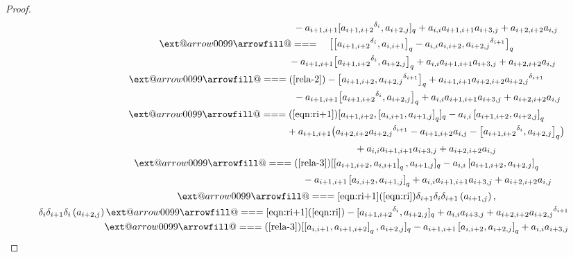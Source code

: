 \documentclass[10pt,a4paper]{amsart}
\makeatletter
\def\x@arrow{\DOTSB\Relbar}
\def\xlongequalsignfill@{\arrowfill@\x@arrow\Relbar\x@arrow}
\providecommand{\xlongequal}[2][]{%
	\ext@arrow 0099\xlongequalsignfill@{#1}{#2}}
\numberwithin{equation}{section}
\def\lr#1{\left[#1\right]}
\def\lrb#1{\left(#1\right)}
\def\d{\delta}
\makeatother
\begin{document}
\begin{proof}
\begin{gather*}
 \phantom{ \d_i\d_{i+1}\d_i\lrb{a_{i+1,j}}\xlongequal{\qquad}\!\!}{} -a_{i+1,i+1}[ {a_{i+1,i+2}}^{\d_{i}}, a_{i+2,j}]_q +a_{i,i}a_{i+1,i+1}a_{i+3,j}+a_{i+2,i+2}a_{i,j}\\
 \phantom{ \d_i\d_{i+1}\d_i\lrb{a_{i+1,j}}}{} \xlongequal{\quad}
\bigl[\bigl[{a_{i+1,i+2}}^{\d_{i}}, a_{i,i+1}\bigr]_q -a_{i,i}a_{i,i+2}, {a_{i+2,j}}^{\d_{i+1}}\bigr]_q \\
 \phantom{ \d_i\d_{i+1}\d_i\lrb{a_{i+1,j}}\xlongequal{\quad}}{} -a_{i+1,i+1}\bigl[{a_{i+1,i+2}}^{\d_{i}}, a_{i+2,j}\bigr]_q +a_{i,i}a_{i+1,i+1}a_{i+3,j}+a_{i+2,i+2}a_{i,j}\\
 \phantom{ \d_i\d_{i+1}\d_i\lrb{a_{i+1,j}}}{}\xlongequal{\lrb{\ref{rela-2}}} -\bigl[a_{i+1,i+2}, {a_{i+2,j}}^{\d_{i+1}}\bigr]_q +a_{i+1,i+1}a_{i+2,i+2}{a_{i+2,j}}^{\d_{i+1}} \\
 \phantom{ \d_i\d_{i+1}\d_i\lrb{a_{i+1,j}}\xlongequal{\qquad}}{} -a_{i+1,i+1}\bigl[{a_{i+1,i+2}}^{\d_{i}}, a_{i+2,j}\bigr]_q +a_{i,i}a_{i+1,i+1}a_{i+3,j}+a_{i+2,i+2}a_{i,j}\\
 \phantom{ \d_i\d_{i+1}\d_i\lrb{a_{i+1,j}}}{} \xlongequal{\lrb{\ref{eqn:ri+1}}} [a_{i+1,i+2},\lr{a_{i,i+1}, a_{i+1,j}}_q]_q -a_{i,i}\lr{a_{i+1,i+2}, a_{i+2,j}}_q \\
 \phantom{ \d_i\d_{i+1}\d_i\lrb{a_{i+1,j}}\xlongequal{\qquad}\!\!}{} +a_{i+1,i+1} \bigl(a_{i+2,i+2}{a_{i+2,j}}^{\d_{i+1}}-a_{i+1,i+2}a_{i,j}-\bigl[{a_{i+1,i+2}}^{\d_{i}}, a_{i+2,j}\bigr]_q \bigr) \\
 \phantom{ \d_i\d_{i+1}\d_i\lrb{a_{i+1,j}}\xlongequal{\qquad}\!\!}{} +a_{i,i}a_{i+1,i+1}a_{i+3,j}+a_{i+2,i+2}a_{i,j}\\
 \phantom{ \d_i\d_{i+1}\d_i\lrb{a_{i+1,j}}}{} \xlongequal{\lrb{\ref{rela-3}}} [\lr{a_{i+1,i+2}, a_{i,i+1}}_q, a_{i+1,j}]_q -a_{i,i}\lr{a_{i+1,i+2}, a_{i+2,j}}_q \\
 \phantom{ \d_i\d_{i+1}\d_i\lrb{a_{i+1,j}}\xlongequal{\qquad}}{} - a_{i+1,i+1}\lr{a_{i,i+2}, a_{i+1,j}}_q +a_{i,i}a_{i+1,i+1}a_{i+3,j}+a_{i+2,i+2}a_{i,j}\\
 \phantom{ \d_i\d_{i+1}\d_i\lrb{a_{i+1,j}}}{} \xlongequal[\eqref{eqn:ri+1}]{\lrb{\ref{eqn:ri}}} \d_{i+1}\d_i\d_{i+1}\lrb{a_{i+1,j}},\\
 \d_i\d_{i+1}\d_i\lrb{a_{i+2,j}}
\xlongequal[\eqref{eqn:ri+1}]{\lrb{\ref{eqn:ri}}} -[{a_{i+1,i+2}}^{\d_{i}}, a_{i+2,j}]_q+a_{i,i}a_{i+3,j}+a_{i+2,i+2}{a_{i+2,j}}^{\d_{i+1}}\\
 \phantom{ \d_i\d_{i+1}\d_i\lrb{a_{i+2,j}}}{}\xlongequal{\lrb{\ref{rela-3}}} [\lr{a_{i,i+1}, a_{i+1,i+2}}_q, a_{i+2,j}]_q -a_{i+1,i+1}\lr{a_{i,i+2}, a_{i+2,j}}_q +a_{i,i}a_{i+3,j} \\

\end{gather*}
\end{proof}
\end{document}
